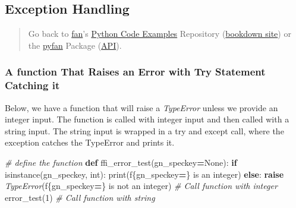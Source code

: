 \documentclass[
]{book}
\newenvironment{Shaded}{\begin{snugshade}}{\end{snugshade}}
\newcommand{\BuiltInTok}[1]{#1}
\newcommand{\CommentTok}[1]{\textcolor[rgb]{0.56,0.35,0.01}{\textit{#1}}}
\newcommand{\ControlFlowTok}[1]{\textcolor[rgb]{0.13,0.29,0.53}{\textbf{#1}}}
\newcommand{\DecValTok}[1]{\textcolor[rgb]{0.00,0.00,0.81}{#1}}
\newcommand{\KeywordTok}[1]{\textcolor[rgb]{0.13,0.29,0.53}{\textbf{#1}}}
\newcommand{\NormalTok}[1]{#1}
\newcommand{\OperatorTok}[1]{\textcolor[rgb]{0.81,0.36,0.00}{\textbf{#1}}}
\newcommand{\PreprocessorTok}[1]{\textcolor[rgb]{0.56,0.35,0.01}{\textit{#1}}}
\newcommand{\SpecialCharTok}[1]{\textcolor[rgb]{0.00,0.00,0.00}{#1}}
\newcommand{\SpecialStringTok}[1]{\textcolor[rgb]{0.31,0.60,0.02}{#1}}
\newcommand{\VariableTok}[1]{\textcolor[rgb]{0.00,0.00,0.00}{#1}}
\begin{document}
\hypertarget{exception-handling}{%
\subsection{Exception Handling}\label{exception-handling}}

\begin{quote}
Go back to \href{http://fanwangecon.github.io/}{fan}'s \href{https://fanwangecon.github.io/Py4Econ/}{Python Code Examples} Repository (\href{https://fanwangecon.github.io/Py4Econ/bookdown}{bookdown site}) or the \href{https://pyfan.readthedocs.io/en/latest/}{pyfan} Package (\href{https://pyfan.readthedocs.io/en/latest/reference.html}{API}).
\end{quote}

\hypertarget{a-function-that-raises-an-error-with-try-statement-catching-it}{%
\subsubsection{A function That Raises an Error with Try Statement Catching it}\label{a-function-that-raises-an-error-with-try-statement-catching-it}}

Below, we have a function that will raise a \emph{TypeError} unless we provide an integer input. The function is called with integer input and then called with a string input. The string input is wrapped in a try and except call, where the exception catches the TypeError and prints it.

\begin{Shaded}
\begin{Highlighting}[]
\CommentTok{\# define the function}
\KeywordTok{def}\NormalTok{ ffi\_error\_test(gn\_speckey}\OperatorTok{=}\VariableTok{None}\NormalTok{):}
    \ControlFlowTok{if} \BuiltInTok{isinstance}\NormalTok{(gn\_speckey, }\BuiltInTok{int}\NormalTok{):}
        \BuiltInTok{print}\NormalTok{(}\SpecialStringTok{f\textquotesingle{}}\SpecialCharTok{\{}\NormalTok{gn\_speckey}\OperatorTok{=}\SpecialCharTok{\}}\SpecialStringTok{ is an integer\textquotesingle{}}\NormalTok{)}
    \ControlFlowTok{else}\NormalTok{:}
        \ControlFlowTok{raise} \PreprocessorTok{TypeError}\NormalTok{(}\SpecialStringTok{f\textquotesingle{}}\SpecialCharTok{\{}\NormalTok{gn\_speckey}\OperatorTok{=}\SpecialCharTok{\}}\SpecialStringTok{ is not an integer\textquotesingle{}}\NormalTok{)}
\CommentTok{\# Call function with integer}
\NormalTok{error\_test(}\DecValTok{1}\NormalTok{)}
\CommentTok{\# Call function with string}
\end{Highlighting}
\end{Shaded}
\end{document}
